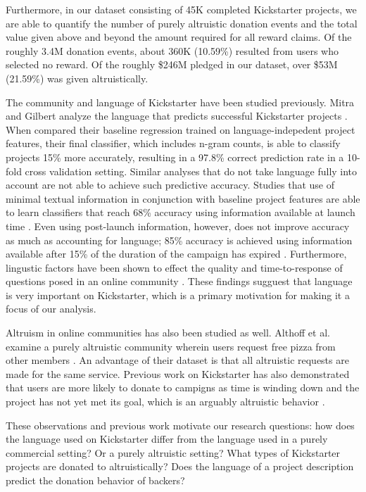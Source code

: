 \documentclass[letterpaper]{article}
\begin{document}
Furthermore, in our dataset consisting of 45K completed Kickstarter projects, we are able to quantify the number of purely altruistic donation events and the total value given above and beyond the amount required for all reward claims. Of the roughly 3.4M donation events, about 360K (10.59\%) resulted from users who selected no reward. Of the roughly \$246M pledged in our dataset, over \$53M (21.59\%) was given altruistically.

The community and language of Kickstarter have been studied previously. Mitra and Gilbert analyze the language that predicts successful Kickstarter projects \cite{mitra2014language}. When compared their baseline regression trained on language-indepedent project features, their final classifier, which includes n-gram counts, is able to classify projects 15\% more accurately, resulting in a 97.8\% correct prediction rate in a 10-fold cross validation setting. Similar analyses that do not take language fully into account are not able to achieve such predictive accuracy. Studies that use of minimal textual information in conjunction with baseline project features are able to learn classifiers that reach 68\% accuracy using information available at launch time \cite{greenberg2013crowdfunding}. Even using post-launch information, however, does not improve accuracy as much as accounting for language; 85\% accuracy is achieved using information available after 15\% of the duration of the campaign has expired \cite{etter2013launch}. Furthermore, lingustic factors have been shown to effect the quality and time-to-response of questions posed in an online community \cite{teevan2011factors}. These findings sugguest that language is very important on Kickstarter, which is a primary motivation for making it a focus of our analysis.

Altruism in online communities has also been studied as well. Althoff et al. examine a purely altruistic community wherein users request free pizza from other members \cite{althoff2014ask}. An advantage of their dataset is that all altruistic requests are made for the same service. Previous work on Kickstarter has also demonstrated that users are more likely to donate to campigns as time is winding down and the project has not yet met its goal, which is an arguably altruistic behavior \cite{kuppuswamy2013crowdfunding}.

These observations and previous work motivate our research questions: how does the language used on Kickstarter differ from the language used in a purely commercial setting? Or a purely altruistic setting? What types of Kickstarter projects are donated to altruistically? Does the language of a project description predict the donation behavior of backers?
\end{document}
